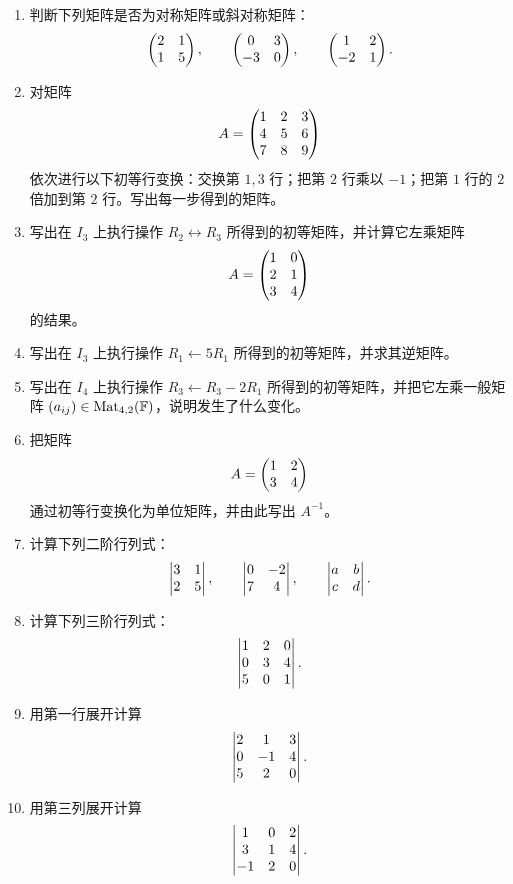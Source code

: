 \begin{enumerate}[label=\arabic*.]
  \item \basic 判断下列矩阵是否为对称矩阵或斜对称矩阵：
  \[
  \begin{pmatrix} 2&1\\1&5 \end{pmatrix},\qquad \begin{pmatrix} 0&3\\-3&0 \end{pmatrix},\qquad \begin{pmatrix} 1&2\\-2&1 \end{pmatrix}.
  \]

  \item \basic 对矩阵
  \[
  A=\begin{pmatrix} 1&2&3\\4&5&6\\7&8&9 \end{pmatrix}
  \]
  依次进行以下初等行变换：交换第 $1,3$ 行；把第 $2$ 行乘以 $-1$；把第 $1$ 行的 $2$ 倍加到第 $2$ 行。写出每一步得到的矩阵。

  \item \basic 写出在 $I_3$ 上执行操作 $R_2\leftrightarrow R_3$ 所得到的初等矩阵，并计算它左乘矩阵
  \[
  A=\begin{pmatrix} 1&0\\2&1\\3&4 \end{pmatrix}
  \]
  的结果。

  \item \basic 写出在 $I_3$ 上执行操作 $R_1\leftarrow 5R_1$ 所得到的初等矩阵，并求其逆矩阵。

  \item \basic 写出在 $I_4$ 上执行操作 $R_3\leftarrow R_3-2R_1$ 所得到的初等矩阵，并把它左乘一般矩阵 $(a_{ij})\in\mathrm{Mat}_{4,2}(\mathbb{F})$，说明发生了什么变化。

  \item \basic 把矩阵
  \[
  A=\begin{pmatrix} 1&2\\3&4 \end{pmatrix}
  \]
  通过初等行变换化为单位矩阵，并由此写出 $A^{-1}$。

  \item \basic 计算下列二阶行列式：
  \[
  \begin{vmatrix} 3&1\\2&5 \end{vmatrix},\qquad \begin{vmatrix} 0&-2\\7&4 \end{vmatrix},\qquad \begin{vmatrix} a&b\\c&d \end{vmatrix}.
  \]

  \item \basic 计算下列三阶行列式：
  \[
  \begin{vmatrix} 1&2&0\\0&3&4\\5&0&1 \end{vmatrix}.
  \]

  \item \basic 用第一行展开计算
  \[
  \begin{vmatrix} 2&1&3\\0&-1&4\\5&2&0 \end{vmatrix}.
  \]

  \item \basic 用第三列展开计算
  \[
  \begin{vmatrix} 1&0&2\\3&1&4\\-1&2&0 \end{vmatrix}.
  \]


\end{enumerate}
